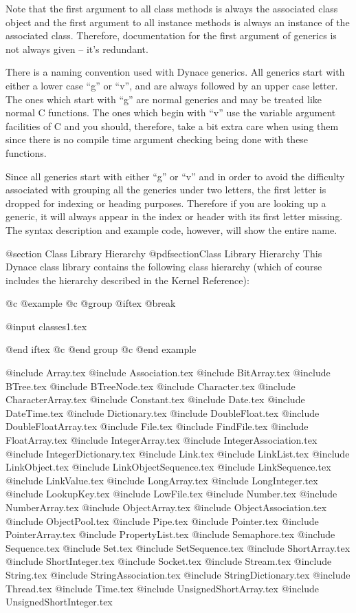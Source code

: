 Note that the first argument to all class methods is always the
associated class object and the first argument to all instance methods
is always an instance of the associated class.  Therefore, documentation
for the first argument of generics is not always given -- it's redundant.

There is a naming convention used with Dynace generics.  All generics
start with either a lower case ``g'' or ``v'', and are always
followed by an upper case letter.  The ones which start with ``g'' are
normal generics and may be treated like normal C functions.  The ones
which begin with ``v'' use the variable argument facilities of C and
you should, therefore, take a bit extra care when using them since
there is no compile time argument checking being done with these functions.

Since all generics start with either ``g'' or ``v'' and in order to
avoid the difficulty associated with grouping all the generics under
two letters, the first letter is dropped for indexing or heading
purposes.  Therefore if you are looking up a generic, it will always
appear in the index or header with its first letter missing.  The syntax
description and example code, however, will show the entire name.





@section Class Library Hierarchy
@pdfsection{Class Library Hierarchy}
This Dynace class library contains the following class hierarchy (which of
course includes the hierarchy described in the Kernel Reference):

@c @example
@c @group
@iftex
@break

@input classes1.tex


@end iftex
@c @end group
@c @end example


@include Array.tex
@include Association.tex
@include BitArray.tex
@include BTree.tex
@include BTreeNode.tex
@include Character.tex
@include CharacterArray.tex
@include Constant.tex
@include Date.tex
@include DateTime.tex
@include Dictionary.tex
@include DoubleFloat.tex
@include DoubleFloatArray.tex
@include File.tex
@include FindFile.tex
@include FloatArray.tex
@include IntegerArray.tex
@include IntegerAssociation.tex
@include IntegerDictionary.tex
@include Link.tex
@include LinkList.tex
@include LinkObject.tex
@include LinkObjectSequence.tex
@include LinkSequence.tex
@include LinkValue.tex
@include LongArray.tex
@include LongInteger.tex
@include LookupKey.tex
@include LowFile.tex
@include Number.tex
@include NumberArray.tex
@include ObjectArray.tex
@include ObjectAssociation.tex
@include ObjectPool.tex
@include Pipe.tex
@include Pointer.tex
@include PointerArray.tex
@include PropertyList.tex
@include Semaphore.tex
@include Sequence.tex
@include Set.tex
@include SetSequence.tex
@include ShortArray.tex
@include ShortInteger.tex
@include Socket.tex
@include Stream.tex
@include String.tex
@include StringAssociation.tex
@include StringDictionary.tex
@include Thread.tex
@include Time.tex
@include UnsignedShortArray.tex
@include UnsignedShortInteger.tex


